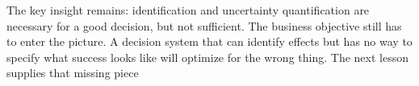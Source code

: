 The key insight remains: identification and uncertainty quantification are necessary
for a good decision, but not sufficient. The business objective still has to enter
the picture. A decision system that can identify effects but has no way to
specify what success looks like will optimize for the wrong thing. The next lesson
supplies that missing piece

